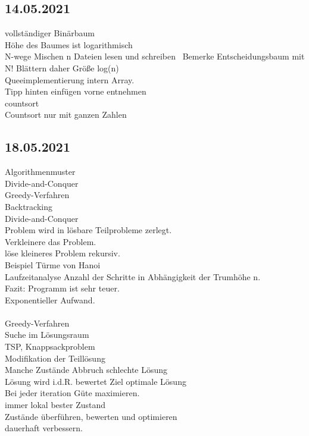 \documentclass{article}
\begin{document}
 	\subsection*{14.05.2021}
 	vollständiger Binärbaum \\
 	Höhe des Baumes ist logarithmisch \\
 	N-wege Mischen n Dateien lesen und schreiben \
 	Bemerke Entscheidungsbaum mit N! Blättern daher Größe log(n) \\
 	Queeimplementierung intern Array. \\
 	Tipp hinten einfügen vorne entnehmen \\
 	countsort \\
 	Countsort nur mit ganzen Zahlen  \\
 	\subsection*{18.05.2021}   
 	Algorithmenmuster \\
 	Divide-and-Conquer \\
 	Greedy-Verfahren \\
 	Backtracking \\
 	Divide-and-Conquer \\
 	Problem wird in lösbare Teilprobleme zerlegt. \\
 	Verkleinere das Problem. \\
 	löse kleineres Problem rekursiv. \\
 	Beispiel Türme von Hanoi \\
 	Laufzeitanalyse Anzahl der Schritte in Abhängigkeit der Trumhöhe n. \\
 	Fazit: Programm ist sehr teuer. \\
 	Exponentieller Aufwand. \\
 	\\
 	Greedy-Verfahren \\
 	Suche im Lösungsraum \\
 	TSP, Knappsackproblem \\
 	Modifikation der Teillösung \\
 	Manche Zustände Abbruch schlechte Lösung  \\
 	Lösung wird i.d.R. bewertet Ziel optimale Lösung \\
 	Bei jeder iteration Güte maximieren. \\
 	immer lokal bester Zustand \\
 	Zustände überführen, bewerten und optimieren \\
 	dauerhaft verbessern. \\
\end{document}
